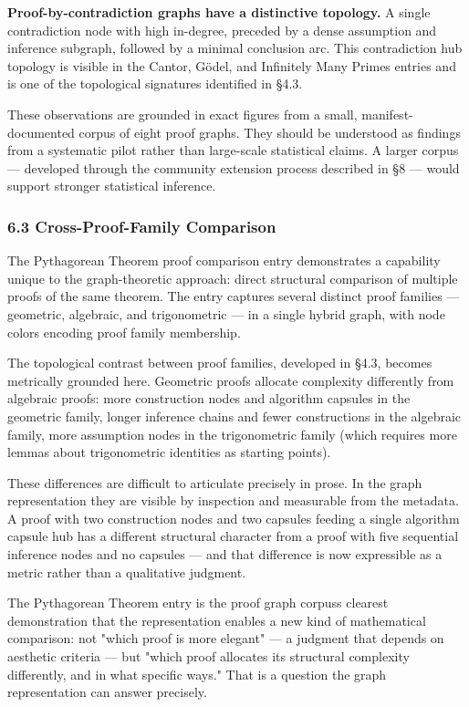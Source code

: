 \documentclass[
  11pt]{article}
\begin{document}
\textbf{Proof-by-contradiction graphs have a distinctive topology.} A
single contradiction node with high in-degree, preceded by a dense
assumption and inference subgraph, followed by a minimal conclusion arc.
This contradiction hub topology is visible in the Cantor, Gödel, and
Infinitely Many Primes entries and is one of the topological signatures
identified in §4.3.

These observations are grounded in exact figures from a small,
manifest-documented corpus of eight proof graphs. They should be
understood as findings from a systematic pilot rather than large-scale
statistical claims. A larger corpus --- developed through the community
extension process described in §8 --- would support stronger statistical
inference.

\hypertarget{63-cross-proof-family-comparison}{%
\subsubsection{6.3 Cross-Proof-Family
Comparison}\label{63-cross-proof-family-comparison}}

The Pythagorean Theorem proof comparison entry demonstrates a capability
unique to the graph-theoretic approach: direct structural comparison of
multiple proofs of the same theorem. The entry captures several distinct
proof families --- geometric, algebraic, and trigonometric --- in a
single hybrid graph, with node colors encoding proof family membership.

The topological contrast between proof families, developed in §4.3,
becomes metrically grounded here. Geometric proofs allocate complexity
differently from algebraic proofs: more construction nodes and algorithm
capsules in the geometric family, longer inference chains and fewer
constructions in the algebraic family, more assumption nodes in the
trigonometric family (which requires more lemmas about trigonometric
identities as starting points).

These differences are difficult to articulate precisely in prose. In the
graph representation they are visible by inspection and measurable from
the metadata. A proof with two construction nodes and two capsules
feeding a single algorithm capsule hub has a different structural
character from a proof with five sequential inference nodes and no
capsules --- and that difference is now expressible as a metric rather
than a qualitative judgment.

The Pythagorean Theorem entry is the proof graph
corpus\textquotesingle s clearest demonstration that the representation
enables a new kind of mathematical comparison: not "which proof is more
elegant" --- a judgment that depends on aesthetic criteria --- but
"which proof allocates its structural complexity differently, and in
what specific ways." That is a question the graph representation can
answer precisely.
\end{document}
